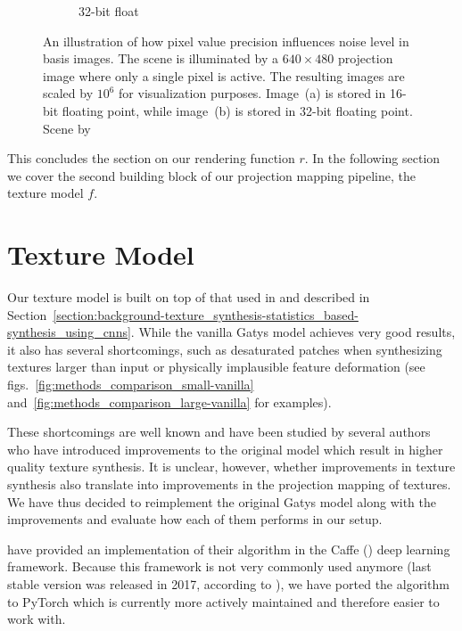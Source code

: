 \begin{figure}[]
\begin{subfigure}[b]{0.48\textwidth}
        \caption{32-bit float}
        \label{fig:methods_float32}
    \end{subfigure}
    \caption{An illustration of how pixel value precision influences noise level in basis images. The scene is illuminated by a \(640 \times 480\) projection image where only a single pixel is active. The resulting images are scaled by \(10^6\) for visualization purposes. Image~(a) is stored in 16-bit floating point, while image~(b) is stored in 32-bit floating point. Scene by \citet{Bitterli16}}
    \label{fig:methods_float}
\end{figure}

This concludes the section on our rendering function \(r\). In the following section we cover the second building block of our projection mapping pipeline, the texture model \(f\).

\section{Texture Model}
\label{section:methods-texture_model}

Our texture model is built on top of that used in \citet{Gatys2015} and described in Section~\ref{section:background-texture_synthesis-statistics_based-synthesis_using_cnns}. While the vanilla Gatys model achieves very good results, it also has several shortcomings, such as desaturated patches when synthesizing textures larger than input or physically implausible feature deformation (see figs.~\ref{fig:methods_comparison_small-vanilla} and~\ref{fig:methods_comparison_large-vanilla} for examples).

These shortcomings are well known and have been studied by several authors who have introduced improvements to the original model which result in higher quality texture synthesis. It is unclear, however, whether improvements in texture synthesis also translate into improvements in the projection mapping of textures. We have thus decided to reimplement the original Gatys model along with the improvements and evaluate how each of them performs in our setup.

\citet{Gatys2015} have provided an implementation of their algorithm in the Caffe (\citet{Jia2014}) deep learning framework. Because this framework is not very commonly used anymore (last stable version was released in 2017, according to \citet{CaffeGitHub}), we have ported the algorithm to PyTorch which is currently more actively maintained and therefore easier to work with.

